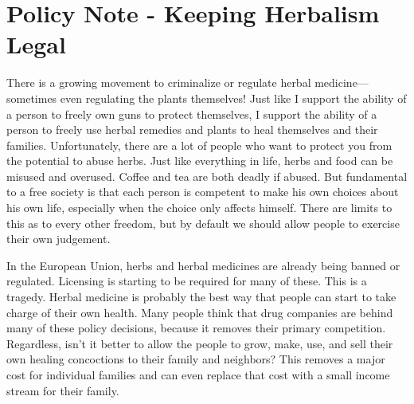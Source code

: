 \documentclass[letterpaper]{article}
\begin{document}
\section{Policy Note - Keeping Herbalism Legal}
{\color{black}
There is a growing movement to criminalize or regulate herbal
medicine—sometimes even regulating the plants themselves!  Just like I
support the ability of a person to freely own guns to protect
themselves, I support the ability of a person to freely use herbal
remedies and plants to heal themselves and their families.
Unfortunately, there are a lot of people who want to
{\textquotedbl}protect{\textquotedbl} you from the potential to abuse
herbs. Just like everything in life, herbs and food can be misused and
overused. Coffee and tea are both deadly if abused. But fundamental to
a free society is that each person is competent to make
\textcolor[rgb]{0.32941177,0.5529412,0.83137256}{his} own choices about
\textcolor[rgb]{0.32941177,0.5529412,0.83137256}{his} own life,
especially when the choice only affects himself.  There are limits to
this as to every other freedom, but by default we should allow people
to exercise their own judgement.}

{\color{black}
In the European Union, herbs and herbal medicines are already being
banned or regulated. Licensing is starting to be required for many of
these. This is a tragedy. Herbal medicine is probably the best way that
people can start to take charge of their own health. Many people think
that drug companies are behind many of these policy decisions, because
it removes their primary competition.
\textcolor[rgb]{0.32941177,0.5529412,0.83137256}{Regardless},
\textcolor[rgb]{0.32941177,0.5529412,0.83137256}{isn’t it better to}
allow \textcolor[rgb]{0.32941177,0.5529412,0.83137256}{the people} to
grow, make, use, and sell their own healing concoctions to their family
and neighbors?  This removes a major cost
\textcolor[rgb]{0.32941177,0.5529412,0.83137256}{for individual
families }and can even replace
\textcolor[rgb]{0.32941177,0.5529412,0.83137256}{that}
\textcolor[rgb]{0.32941177,0.5529412,0.83137256}{cost} with a small
income stream for their family.}
\end{document}
